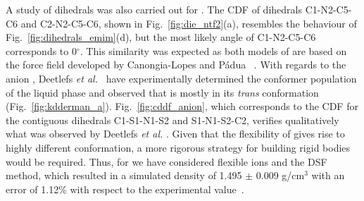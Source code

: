 \documentclass[3p,twocolumn]{elsarticle}
\begin{document}
A study of dihedrals was also carried out for \ce{[emim][NTf_2]}. The CDF of dihedrals C1-N2-C5-C6 and C2-N2-C5-C6, shown in Fig.~\ref{fig:die_ntf2}(a), resembles the behaviour of Fig.~\ref{fig:dihedrals_emim}(d), but the most likely angle of C1-N2-C5-C6 corresponds to 0$^{\circ}$. This similarity was expected as both models of \ce{[emim]^+} are based on the force field developed by Canongia-Lopes and P\'{a}dua~ \cite{Canongia_Lopes_2006}. With regards to the anion \ce{[NTf_2]^-}, Deetlefs \textit{et al.}~\cite{Deetlefs_2006} have experimentally determined the conformer population of the liquid phase and observed that \ce{[NTf_2]^-} is mostly in its \textit{trans} conformation (Fig.~\ref{fig:kdderman_a}). Fig.~\ref{fig:cddf_anion}, which corresponds to the CDF for the contiguous dihedrals C1-S1-N1-S2 and S1-N1-S2-C2, verifies qualitatively what was observed by Deetlefs \textit{et al.} \cite{Deetlefs_2006}. Given that the flexibility of \ce{[NTf_2]^-} gives rise to highly different conformation, a more rigorous strategy for building rigid bodies would be required. Thus, for \ce{[emim][NTf_2]} we have considered flexible ions and the DSF method, which resulted in a simulated density of 1.495 $\pm$ 0.009 g/cm$^3$ with an error of 1.12\% with respect to the experimental value~\cite{Tokuda_2005}.
\end{document}
